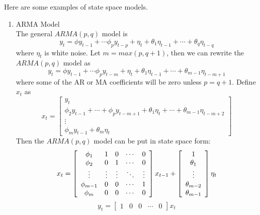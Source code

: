 \documentclass[mstat,12pt]{unswthesis}  %
\numberwithin{equation}{section}
\begin{document}
\noindent Here are some examples of state space models.
\begin{enumerate}
    \item ARMA Model\\
    The general $ARMA(p,q)$ model is
    \begin{equation}y_{t}=\phi y_{t-1}+\cdots \phi_{p} y_{t-p}+\eta_{t}+\theta_{1} \eta_{t-1}+\cdots+\theta_{q} \eta_{t-q}\end{equation}
    where $\eta_{t}$ is white noise. Let $m = max(p, q + 1)$, then
    we can rewrite the $ARMA(p,q)$ model as
    \begin{equation}y_{t}=\phi y_{t-1}+\cdots \phi_{p} y_{t-m}+\eta_{t}+\theta_{1} \eta_{t-1}+\cdots+\theta_{m-1} \eta_{t-m+1}\end{equation}
    where some of the AR or MA coefficients will be zero unless $p = q + 1$. Define $x_{t}$ as
    \begin{equation}x_{t}=\left[\begin{array}{c}
    y_{t} \\
    \phi_{2} y_{t-1}+\cdots+\phi_{p} y_{t-m+1}+\theta_{1} \eta_{t}+\cdots+\theta_{m-1} \eta_{t-m+2} \\
    \vdots \\
    \phi_{m} y_{t-1}+\theta_{m} \eta_{t}
    \end{array}\right]\end{equation}
    Then the $ARMA(p,q)$ model can be put in state space form:
    \begin{equation}x_{t}=\left[\begin{array}{ccccc}
    \phi_{1} & 1 & 0 & \cdots & 0 \\
    \phi_{2} & 0 & 1 & \cdots & 0 \\
    \vdots & \vdots & \vdots & \ddots & \vdots \\
    \phi_{m-1} & 0 & 0 & \cdots & 1 \\
    \phi_{m} & 0 & 0 & \cdots & 0
    \end{array}\right] x_{t-1}+\left[\begin{array}{c}
    1 \\
    \theta_{1} \\
    \vdots \\
    \theta_{m-2} \\
    \theta_{m-1}
    \end{array}\right] \eta_{t}\\
    \end{equation}
    \begin{equation}
    y_{t}=\left[\begin{array}{ccccc}1 & 0 & 0 & \cdots & 0\end{array}\right] x_{t} 
    \end{equation}
 

\end{enumerate}
\end{document}
